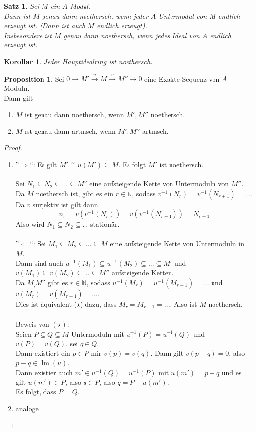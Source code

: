 \documentclass[10pt,a4paper]{article}
\newcommand{\N}{\ensuremath{\mathbb{N}}}
\newcommand{\isomorph}{\ensuremath{\overset{\sim}{=}}}
\newcommand{\Img}{\ensuremath{\operatorname{Im}}}
\newcounter{thm}[section]
\theoremstyle{definition}
\newtheorem{prop}[thm]{Proposition}
\theoremstyle{plain}
\newtheorem{kor}[thm]{Korollar}
\newtheorem{satz}[thm]{Satz}
\theoremstyle{remark}
\begin{document}
\begin{satz}
	Sei $M$ ein $A$-Modul.\\
	Dann ist $M$ genau dann noethersch, wenn jeder $A$-Untermodul von $M$ endlich erzeugt ist. (Dann ist auch $M$ endlich erzeugt).\\
	Insbesondere ist $M$ genau dann noethersch, wenn jedes Ideal von $A$ endlich erzeugt ist.
\end{satz}
\begin{kor}
	Jeder Hauptidealring ist noethersch.
\end{kor}
\begin{prop}
	\label{506Prop}
	Sei $0\rightarrow M'\xrightarrow{u}M\xrightarrow{v}M''\rightarrow 0$ eine Exakte Sequenz von $A$-Moduln.\\
	Dann gilt
	\begin{enumerate}
		\item $M$ ist genau dann noethersch, wenn $M',M''$ noethersch.
		\item $M$ ist genau dann artinsch, wenn $M',M''$ artinsch.
	\end{enumerate}
\end{prop}
\begin{proof}
	\begin{enumerate}
		\item ''$\Rightarrow$``:
			Es gilt $M'\isomorph u(M')\subseteq M$. Es folgt $M'$ ist noethersch.\\
			\\
			Sei $N_1\subseteq N_2\subseteq ...\subseteq M''$ eine aufsteigende Kette von Untermoduln von $M''$. Da $M$ noethersch ist, gibt es ein $r\in\N$, sodass $v^{-1}(N_r)=v^{-1}(N_{r+1})=...$.\\
			Da $v$ surjektiv ist gilt dann
			\[n_r=v(v^{-1}(N_r))=v(v^{-1}(N_{r+1}))=N_{r+1}\]
			Also wird $N_1\subseteq N_2\subseteq...$ stationär.\\
			\\
		''$\Leftarrow$``: 
			Sei $M_1\subseteq M_2\subseteq...\subseteq M$ eine aufsteigende Kette von Untermoduln in $M$.\\
			Dann sind auch $u^{-1}(M_1)\subseteq u^{-1}(M_2)\subseteq...\subseteq M'$ und $v(M_1)\subseteq v(M_2)\subseteq...\subseteq M''$ aufsteigende Ketten.\\
			Da $M_,M''$ gibt es $r\in\N$, sodass $u^{-1}(M_r)=u^{-1}(M_{r+1})=...$ und $v(M_r)=v(M_{r+1})=...$.\\
			Dies ist äquivalent ($\star$) dazu, dass $M_r=M_{r+1}=...$. Also ist $M$ noethersch.\\
			\\
		Beweis von $(\star)$:\\
		Seien $P\subseteq Q\subseteq M$ Untermoduln mit $u^{-1}(P)=u^{-1}(Q)$ und $v(P)=v(Q)$, sei $q\in Q$.\\
		Dann existiert ein $p\in P$ mir $v(p)=v(q)$. Dann gilt $v(p-q)=0$, also $p-q\in\Img(u)$.\\
		Dann existier auch $m'\in u^{-1}(Q)=u^{-1}(P)$ mit $u(m')=p-q$ und es gilt $u(m')\in P$, also $q\in P$, also $q=P-u(m')$.\\
		Es folgt, dass $P=Q$.
		\item analoge
	\end{enumerate}
\end{proof}
\end{document}
